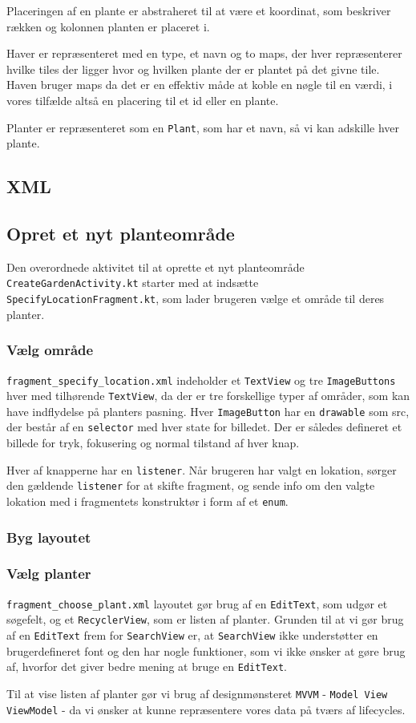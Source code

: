 Placeringen af en plante er abstraheret til at være et koordinat, som beskriver rækken og kolonnen planten er placeret i.

Haver er repræsenteret med en type, et navn og to maps, der hver repræsenterer hvilke tiles der ligger hvor og hvilken plante der er plantet på det givne tile.
Haven bruger maps da det er en effektiv måde at koble en nøgle til en værdi, i vores tilfælde altså en placering til et id eller en plante.

Planter er repræsenteret som en \texttt{Plant}, som har et navn, så vi kan adskille hver plante.

\subsection{XML}

\subsection{Opret et nyt planteområde}
Den overordnede aktivitet til at oprette et nyt planteområde \texttt{CreateGardenActivity.kt} starter med at indsætte \texttt{SpecifyLocationFragment.kt}, som lader brugeren vælge et område til deres planter.

\subsubsection{Vælg område}
\texttt{fragment\_specify\_location.xml} indeholder et \texttt{TextView} og tre \texttt{ImageButtons} hver med tilhørende \texttt{TextView}, da der er tre forskellige typer af områder, som kan have indflydelse på planters pasning. Hver \texttt{ImageButton} har en \texttt{drawable} som src, der består af en \texttt{selector} med hver state for billedet. Der er således defineret et billede for tryk, fokusering og normal tilstand af hver knap.

Hver af knapperne har en \texttt{listener}. Når brugeren har valgt en lokation, sørger den gældende \texttt{listener} for at skifte fragment, og sende info om den valgte lokation med i fragmentets konstruktør i form af et \texttt{enum}.

\subsubsection{Byg layoutet}

\subsubsection{Vælg planter}

\texttt{fragment\_choose\_plant.xml} layoutet gør brug af en \texttt{EditText}, som udgør et søgefelt, og et \texttt{RecyclerView}, som er listen af planter.
Grunden til at vi gør brug af en \texttt{EditText} frem for \texttt{SearchView} er, at \texttt{SearchView} ikke understøtter en brugerdefineret font og den har nogle funktioner, som vi ikke ønsker at gøre brug af, hvorfor det giver bedre mening at bruge en \texttt{EditText}.

Til at vise listen af planter gør vi brug af designmønsteret \texttt{MVVM} - \texttt{Model View ViewModel} - da vi ønsker at kunne repræsentere vores data på tværs af lifecycles.
